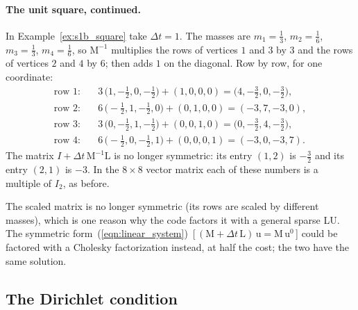 \paragraph{The unit square, continued.} In Example~\ref{ex:s1b_square} take $\Delta t = 1$. The masses are $m_1 = \frac13$, $m_2 = \frac16$, $m_3 = \frac13$, $m_4 = \frac16$, so $\mathrm M^{-1}$ multiplies the rows of vertices $1$ and $3$ by $3$ and the rows of vertices $2$ and $4$ by $6$; then  adds $1$ on the diagonal. Row by row, for one coordinate:
\begin{align*}
\text{row 1:}\quad & 3\,\big(1, -\tfrac12, 0, -\tfrac12\big) + (1, 0, 0, 0) = \big(4, -\tfrac32, 0, -\tfrac32\big), \\
\text{row 2:}\quad & 6\,\big(-\tfrac12, 1, -\tfrac12, 0\big) + (0, 1, 0, 0) = (-3, 7, -3, 0), \\
\text{row 3:}\quad & 3\,\big(0, -\tfrac12, 1, -\tfrac12\big) + (0, 0, 1, 0) = \big(0, -\tfrac32, 4, -\tfrac32\big), \\
\text{row 4:}\quad & 6\,\big(-\tfrac12, 0, -\tfrac12, 1\big) + (0, 0, 0, 1) = (-3, 0, -3, 7) .
\end{align*}
The matrix $I + \Delta t\,\mathrm M^{-1}\mathrm L$ is no longer symmetric: its entry $(1, 2)$ is $-\frac32$ and its entry $(2, 1)$ is $-3$. In the $8\times 8$ vector matrix each of these numbers is a multiple of $I_2$, as before.

The scaled matrix is no longer symmetric (its rows are scaled by different masses), which is one reason why the code factors it with a general sparse LU. The symmetric form~(\ref{eqn:linear_system})~[\,$(\mathrm M + \Delta t\,\mathrm L)\,\mathrm u = \mathrm M\,\mathrm u^0$\,] could be factored with a Cholesky factorization instead, at half the cost; the two have the same solution.

\subsection{The Dirichlet condition}

